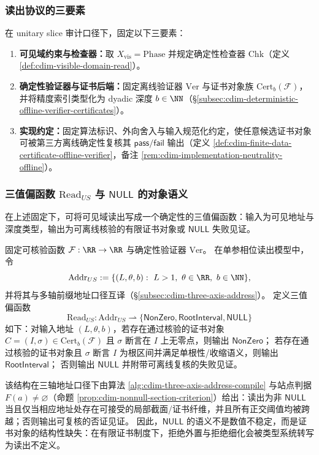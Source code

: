 \subsubsection{读出协议的三要素}
在 unitary slice 审计口径下，固定以下三要素：
\begin{enumerate}
  \item \textbf{可见域约束与检查器：}取 \(X_{\mathrm{vis}}=\mathrm{Phase}\) 并规定确定性检查器 \(\mathrm{Chk}\)（定义 \ref{def:cdim-visible-domain-read}）。
  \item \textbf{确定性验证器与证书后端：}固定离线验证器 \(\mathrm{Ver}\) 与证书对象族 \(\mathrm{Cert}_b(\mathcal F)\)，并将精度索引类型化为 dyadic 深度 \(b\in\NN\)（\S\ref{subsec:cdim-deterministic-offline-verifier-certificates}）。
  \item \textbf{实现约定：}固定算法标识、外向舍入与输入规范化约定，使任意候选证书对象可被第三方离线确定性复核其 \(\mathsf{pass}/\mathsf{fail}\) 输出（定义 \ref{def:cdim-finite-data-certificate-offline-verifier}，备注 \ref{rem:cdim-implementation-neutrality-offline}）。
\end{enumerate}

\subsubsection{三值偏函数 \texorpdfstring{$\mathrm{Read}_{US}$}{Read\_US} 与 \texorpdfstring{$\mathsf{NULL}$}{NULL} 的对象语义}
在上述固定下，可将可见域读出写成一个确定性的三值偏函数：输入为可见地址与深度类型，输出为可离线核验的有限证书对象或 \(\mathsf{NULL}\) 失败见证。
\begin{definition}\label{def:cdim-read-us-partial}
固定可核验函数 \(\mathcal F:\RR\to\RR\) 与确定性验证器 \(\mathrm{Ver}\)。
在单参相位读出模型中，令
\[
\mathrm{Addr}_{US}:=\{(L,\theta,b):\ L>1,\ \theta\in\RR,\ b\in\NN\},
\]
并将其与多轴前缀地址口径互译（\S\ref{subsec:cdim-three-axis-address}）。
定义三值偏函数
\[
\mathrm{Read}_{US}:\mathrm{Addr}_{US}\rightharpoonup \{\mathsf{NonZero},\mathsf{RootInterval},\mathsf{NULL}\}
\]
如下：对输入地址 \((L,\theta,b)\)，若存在通过核验的证书对象 \(C=(I,\sigma)\in\mathrm{Cert}_b(\mathcal F)\) 且 \(\sigma\) 断言在 \(I\) 上无零点，则输出 \(\mathsf{NonZero}\)；
若存在通过核验的证书对象且 \(\sigma\) 断言 \(I\) 为根区间并满足单根性/收缩语义，则输出 \(\mathsf{RootInterval}\)；
否则输出 \(\mathsf{NULL}\) 并附带可离线复核的失败见证。
\end{definition}
该结构在三轴地址口径下由算法 \ref{alg:cdim-three-axis-address-compile} 与站点判据 \(F(a)\neq\varnothing\)（命题 \ref{prop:cdim-nonnull-section-criterion}）给出：读出为非 \(\mathsf{NULL}\) 当且仅当相应地址处存在可接受的局部截面/证书纤维，并且所有正交阈值均被跨越；否则输出可复核的否证见证。
因此，\(\mathsf{NULL}\) 的语义不是数值不稳定，而是证书对象的结构性缺失：在有限证书制度下，拒绝外置与拒绝细化会被类型系统转写为读出不定义。

